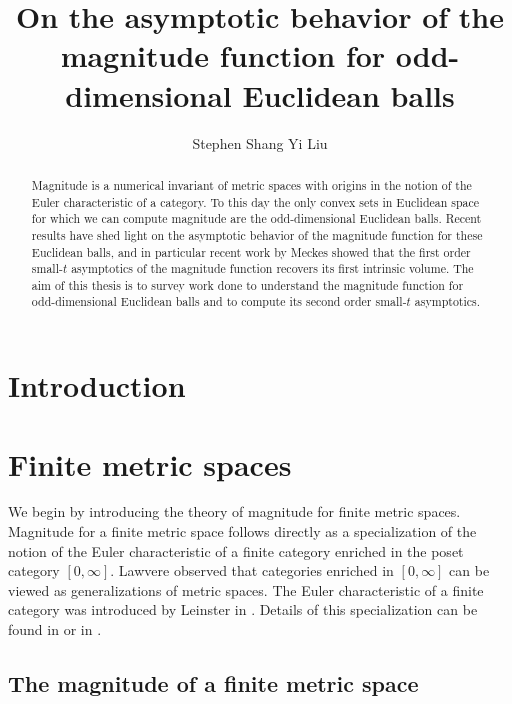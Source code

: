 \documentclass[11pt]{article}
\theoremstyle{mythm}
\begin{document}
\author{Stephen Shang Yi Liu}
\title{On the asymptotic behavior of the magnitude function for odd-dimensional Euclidean balls}
\date{}

\maketitle

\begin{abstract}
Magnitude is a numerical invariant of metric spaces with origins in the notion of the Euler characteristic of a category. To this day the only convex sets in Euclidean space for which we can compute magnitude are the odd-dimensional Euclidean balls. Recent results have shed light on the asymptotic behavior of the magnitude function for these Euclidean balls, and in particular recent work by Meckes showed that the first order small-$t$ asymptotics of the magnitude function recovers its first intrinsic volume. The aim of this thesis is to survey work done to understand the magnitude function for odd-dimensional Euclidean balls and to compute its second order small-$t$ asymptotics.
\end{abstract}

\newpage

\tableofcontents

\newpage

\section{Introduction}

\section{Finite metric spaces}

We begin by introducing the theory of magnitude for finite metric spaces. Magnitude for a finite metric space follows directly as a specialization of the notion of the Euler characteristic of a finite category enriched in the poset category $[0,\infty]$. Lawvere observed that categories enriched in $[0,\infty]$ can be viewed as generalizations of metric spaces. The Euler characteristic of a finite category was introduced by Leinster in \cite{leinster_euler_2006}. Details of this specialization can be found in \cite{leinster_magnitude_2011} or in \cite{leinster_magnitude_2017}.

\subsection{The magnitude of a finite metric space}
\end{document}
